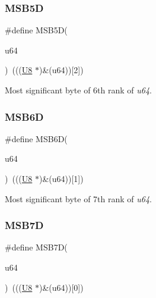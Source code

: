 \subsubsection{\texorpdfstring{MSB5D}{MSB5D}}
{\footnotesize\ttfamily \#define M\+S\+B5D(\begin{DoxyParamCaption}\item[{}]{u64 }\end{DoxyParamCaption})~(((\mbox{\hyperlink{group__group__sam0__utils_gaa63ef7b996d5487ce35a5a66601f3e73}{U8}}  $\ast$)\&(u64))\mbox{[}2\mbox{]})}



Most significant byte of 6th rank of {\itshape u64}. 

\mbox{\label{group__group__sam0__utils_gacb8062d046ca06f5c28c9a015997494b}} 
\subsubsection{\texorpdfstring{MSB6D}{MSB6D}}
{\footnotesize\ttfamily \#define M\+S\+B6D(\begin{DoxyParamCaption}\item[{}]{u64 }\end{DoxyParamCaption})~(((\mbox{\hyperlink{group__group__sam0__utils_gaa63ef7b996d5487ce35a5a66601f3e73}{U8}}  $\ast$)\&(u64))\mbox{[}1\mbox{]})}



Most significant byte of 7th rank of {\itshape u64}. 

\mbox{\label{group__group__sam0__utils_ga0cbce69964fa2dd7bf05911d0b99b014}} 
\subsubsection{\texorpdfstring{MSB7D}{MSB7D}}
{\footnotesize\ttfamily \#define M\+S\+B7D(\begin{DoxyParamCaption}\item[{}]{u64 }\end{DoxyParamCaption})~(((\mbox{\hyperlink{group__group__sam0__utils_gaa63ef7b996d5487ce35a5a66601f3e73}{U8}}  $\ast$)\&(u64))\mbox{[}0\mbox{]})}



